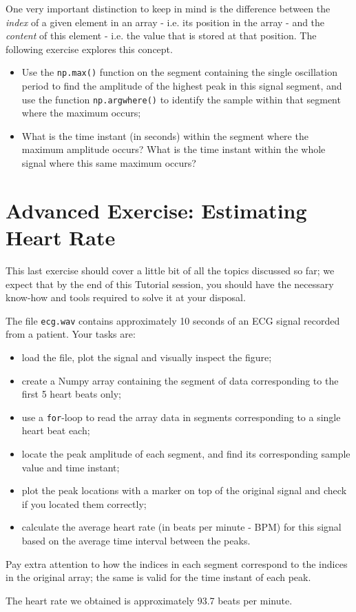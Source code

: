 One very important distinction to keep in mind is the difference between the \emph{index} of a given element in an array - i.e. its position in the array - and the \emph{content} of this element - i.e. the value that is stored at that position. The following exercise explores this concept.

\begin{itemize}
	\item Use the {\tt np.max()} function on the segment containing the single oscillation period to find the amplitude of the highest peak in this signal segment, and use the function {\tt np.argwhere()} to identify the sample within that segment where the maximum occurs;
	\item What is the time instant (in seconds) within the segment where the maximum amplitude occurs? What is the time instant within the whole signal where this same maximum occurs?
\end{itemize}


\section{Advanced Exercise: Estimating Heart Rate}

This last exercise should cover a little bit of all the topics discussed so far; we expect that by the end of this Tutorial session, you should have the necessary know-how and tools required to solve it at your disposal.

The file {\tt ecg.wav} contains approximately 10 seconds of an ECG signal recorded from a patient. Your tasks are:

\begin{itemize}
	\item load the file, plot the signal and visually inspect the figure;
	\item create a Numpy array containing the segment of data corresponding to the first 5 heart beats only;
	\item use a {\tt for}-loop to read the array data in segments corresponding to a single heart beat each;
	\item locate the peak amplitude of each segment, and find its corresponding sample value and time instant;
	\item plot the peak locations with a marker on top of the original signal and check if you located them correctly;
	\item calculate the average heart rate (in beats per minute - BPM) for this signal based on the average time interval between the peaks.
\end{itemize}

Pay extra attention to how the indices in each segment correspond to the indices in the original array; the same is valid for the time instant of each peak.

The heart rate we obtained is approximately 93.7 beats per minute.